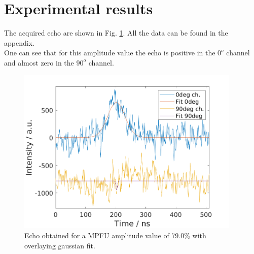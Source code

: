 \documentclass[a4paper, 11pt]{article}
\begin{document}
	\section*{Experimental results}
	The acquired echo are shown in Fig. \ref{fig:exampleEcho}. All the data can be found in the appendix. \\
	One can see that for this amplitude value the echo is positive in the $0^o$ channel and almost zero in the $90^o$ channel.
	\begin{figure}
		\centering
		\includegraphics[width=0.95\textwidth]{../../images/misc-E-001_exampleEcho}
		\caption{Echo obtained for a MPFU amplitude value of $79.0\%$ with overlaying gaussian fit.}
		\label{fig:exampleEcho}
	\end{figure}
	
\end{document}
